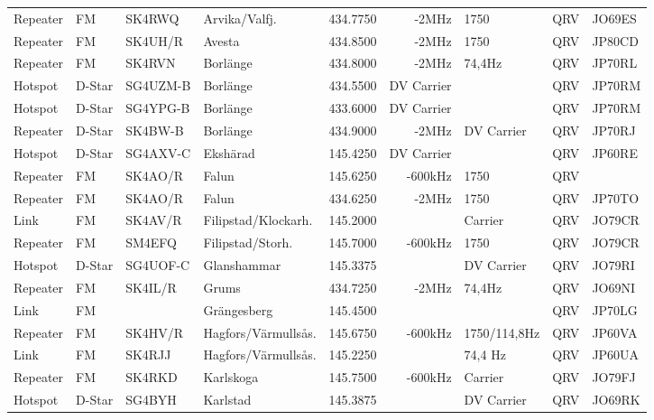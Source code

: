 \begin{landscape}
\begin{longtable}{llllrrlcl}
Repeater & FM     & SK4RWQ   & Arvika/Valfj.       & 434.7750 & -2MHz      & 1750            & QRV  & JO69ES \\
Repeater & FM     & SK4UH/R  & Avesta              & 434.8500 & -2MHz      & 1750            & QRV  & JP80CD \\
Repeater & FM     & SK4RVN   & Borlänge            & 434.8000 & -2MHz      & 74,4Hz          & QRV  & JP70RL \\
Hotspot  & D-Star & SG4UZM-B & Borlänge            & 434.5500 & DV Carrier &                 & QRV  & JP70RM \\
Hotspot  & D-Star & SG4YPG-B & Borlänge            & 433.6000 & DV Carrier &                 & QRV  & JP70RM \\
Repeater & D-Star & SK4BW-B  & Borlänge            & 434.9000 & -2MHz      & DV Carrier      & QRV  & JP70RJ \\
Hotspot  & D-Star & SG4AXV-C & Ekshärad            & 145.4250 & DV Carrier &                 & QRV  & JP60RE \\
Repeater & FM     & SK4AO/R  & Falun               & 145.6250 & -600kHz    & 1750            & QRV  &        \\
Repeater & FM     & SK4AO/R  & Falun               & 434.6250 & -2MHz      & 1750            & QRV  & JP70TO \\
Link     & FM     & SK4AV/R  & Filipstad/Klockarh. & 145.2000 &            & Carrier         & QRV  & JO79CR \\
Repeater & FM     & SM4EFQ   & Filipstad/Storh.    & 145.7000 & -600kHz    & 1750            & QRV  & JO79CR \\
Hotspot  & D-Star & SG4UOF-C & Glanshammar         & 145.3375 &            & DV Carrier      & QRV  & JO79RI \\
Repeater & FM     & SK4IL/R  & Grums               & 434.7250 & -2MHz      & 74,4Hz          & QRV  & JO69NI \\
Link     & FM     &          & Grängesberg         & 145.4500 &            &                 & QRV  & JP70LG \\
Repeater & FM     & SK4HV/R  & Hagfors/Värmullsås. & 145.6750 & -600kHz    & 1750/114,8Hz    & QRV  & JP60VA \\
Link     & FM     & SK4RJJ   & Hagfors/Värmullsås. & 145.2250 &            & 74,4 Hz         & QRV  & JP60UA \\
Repeater & FM     & SK4RKD   & Karlskoga           & 145.7500 & -600kHz    & Carrier         & QRV  & JO79FJ \\
Hotspot  & D-Star & SG4BYH   & Karlstad            & 145.3875 &            & DV Carrier      & QRV  & JO69RK \\

\end{longtable}
\end{landscape}
